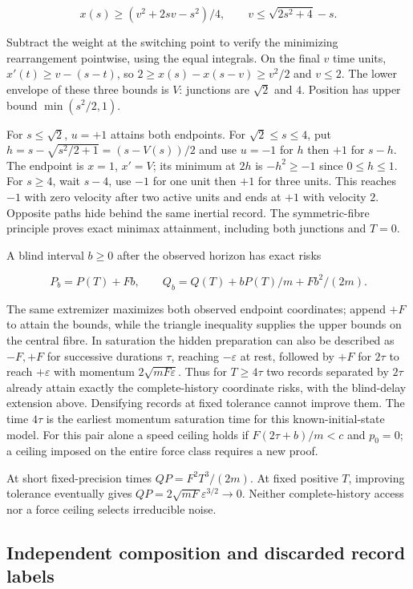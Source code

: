 \documentclass[11pt,a4paper]{article}
\begin{document}
\[x(s)\ge(v^2+2sv-s^2)/4,\qquad v\le\sqrt{2s^2+4}-s.\]

Subtract the weight at the switching point to verify the minimizing
rearrangement pointwise, using the equal integrals. On the final \(v\)
time units, \(x'(t)\ge v-(s-t)\), so \(2\ge x(s)-x(s-v)\ge v^2/2\) and
\(v\le2\). The lower envelope of these three bounds is \(V\): junctions
are \(\sqrt2\) and \(4\). Position has upper bound \(\min(s^2/2,1)\).

For \(s\le\sqrt2\), \(u=+1\) attains both endpoints. For
\(\sqrt2\le s\le4\), put \(h=s-\sqrt{s^2/2+1}=(s-V(s))/2\) and use
\(u=-1\) for \(h\) then \(+1\) for \(s-h\). The endpoint is \(x=1\),
\(x'=V\); its minimum at \(2h\) is \(-h^2\ge-1\) since \(0\le h\le1\).
For \(s\ge4\), wait \(s-4\), use \(-1\) for one unit then \(+1\) for
three units. This reaches \(-1\) with zero velocity after two active
units and ends at \(+1\) with velocity \(2\). Opposite paths hide behind
the same inertial record. The symmetric-fibre principle proves exact
minimax attainment, including both junctions and \(T=0\).

A blind interval \(b\ge0\) after the observed horizon has exact risks

\[P_b=P(T)+Fb,\qquad Q_b=Q(T)+bP(T)/m+Fb^2/(2m).\]

The same extremizer maximizes both observed endpoint coordinates; append
\(+F\) to attain the bounds, while the triangle inequality supplies the
upper bounds on the central fibre. In saturation the hidden preparation
can also be described as \(-F,+F\) for successive durations \(\tau\),
reaching \(-\varepsilon\) at rest, followed by \(+F\) for \(2\tau\) to
reach \(+\varepsilon\) with momentum \(2\sqrt{mF\varepsilon}\). Thus for
\(T\ge4\tau\) two records separated by \(2\tau\) already attain exactly
the complete-history coordinate risks, with the blind-delay extension
above. Densifying records at fixed tolerance cannot improve them. The
time \(4\tau\) is the earliest momentum saturation time for this
known-initial-state model. For this pair alone a speed ceiling holds if
\(F(2\tau+b)/m<c\) and \(p_0=0\); a ceiling imposed on the entire force
class requires a new proof.

At short fixed-precision times \(QP=F^2T^3/(2m)\). At fixed positive
\(T\), improving tolerance eventually gives
\(QP=2\sqrt{mF}\varepsilon^{3/2}\to0\). Neither complete-history access
nor a force ceiling selects irreducible noise.

\hypertarget{independent-composition-and-discarded-record-labels}{%
\subsection{Independent composition and discarded record
labels}\label{independent-composition-and-discarded-record-labels}}
\end{document}
